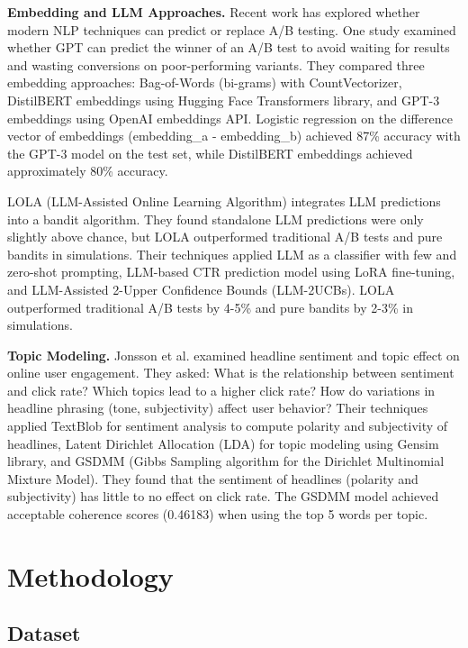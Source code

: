 \documentclass[11pt]{article}
\begin{document}
\textbf{Embedding and LLM Approaches.} Recent work has explored whether modern NLP techniques can predict or replace A/B testing. One study \cite{countbayesie2023gpt} examined whether GPT can predict the winner of an A/B test to avoid waiting for results and wasting conversions on poor-performing variants. They compared three embedding approaches: Bag-of-Words (bi-grams) with CountVectorizer, DistilBERT embeddings using Hugging Face Transformers library, and GPT-3 embeddings using OpenAI embeddings API. Logistic regression on the difference vector of embeddings (embedding\_a - embedding\_b) achieved 87\% accuracy with the GPT-3 model on the test set, while DistilBERT embeddings achieved approximately 80\% accuracy.

LOLA (LLM-Assisted Online Learning Algorithm) \cite{bastani2024lola} integrates LLM predictions into a bandit algorithm. They found standalone LLM predictions were only slightly above chance, but LOLA outperformed traditional A/B tests and pure bandits in simulations. Their techniques applied LLM as a classifier with few and zero-shot prompting, LLM-based CTR prediction model using LoRA fine-tuning, and LLM-Assisted 2-Upper Confidence Bounds (LLM-2UCBs). LOLA outperformed traditional A/B tests by 4-5\% and pure bandits by 2-3\% in simulations.

\textbf{Topic Modeling.} Jonsson et al. \cite{jonsson2021headline} examined headline sentiment and topic effect on online user engagement. They asked: What is the relationship between sentiment and click rate? Which topics lead to a higher click rate? How do variations in headline phrasing (tone, subjectivity) affect user behavior? Their techniques applied TextBlob for sentiment analysis to compute polarity and subjectivity of headlines, Latent Dirichlet Allocation (LDA) for topic modeling using Gensim library, and GSDMM (Gibbs Sampling algorithm for the Dirichlet Multinomial Mixture Model). They found that the sentiment of headlines (polarity and subjectivity) has little to no effect on click rate. The GSDMM model achieved acceptable coherence scores (0.46183) when using the top 5 words per topic.

\section{Methodology}

\subsection{Dataset}
\end{document}
